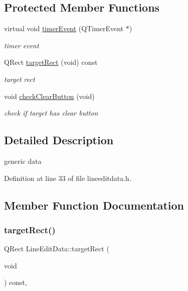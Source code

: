 \subsection*{Protected Member Functions}
\begin{DoxyCompactItemize}
\item 
\mbox{\label{class_line_edit_data_a67a1fa812f838c313a211c6519c31115}} 
virtual void \hyperlink{class_line_edit_data_a67a1fa812f838c313a211c6519c31115}{timer\+Event} (Q\+Timer\+Event $\ast$)
\begin{DoxyCompactList}\small\item\em timer event \end{DoxyCompactList}\item 
Q\+Rect \hyperlink{class_line_edit_data_a5f6f23be0754b372b1051504e6c81120}{target\+Rect} (void) const
\begin{DoxyCompactList}\small\item\em target rect \end{DoxyCompactList}\item 
\mbox{\label{class_line_edit_data_a17d7d37d67ca466dd00fa7799959ea3c}} 
void \hyperlink{class_line_edit_data_a17d7d37d67ca466dd00fa7799959ea3c}{check\+Clear\+Button} (void)
\begin{DoxyCompactList}\small\item\em check if target has clear button \end{DoxyCompactList}\end{DoxyCompactItemize}


\subsection{Detailed Description}
generic data 

Definition at line 33 of file lineeditdata.\+h.



\subsection{Member Function Documentation}
\mbox{\label{class_line_edit_data_a5f6f23be0754b372b1051504e6c81120}} 
\subsubsection{\texorpdfstring{target\+Rect()}{targetRect()}}
{\footnotesize\ttfamily Q\+Rect Line\+Edit\+Data\+::target\+Rect (\begin{DoxyParamCaption}\item[{void}]{ }\end{DoxyParamCaption}) const\hspace{0.3cm}{\ttfamily [inline]}, {\ttfamily [protected]}}



